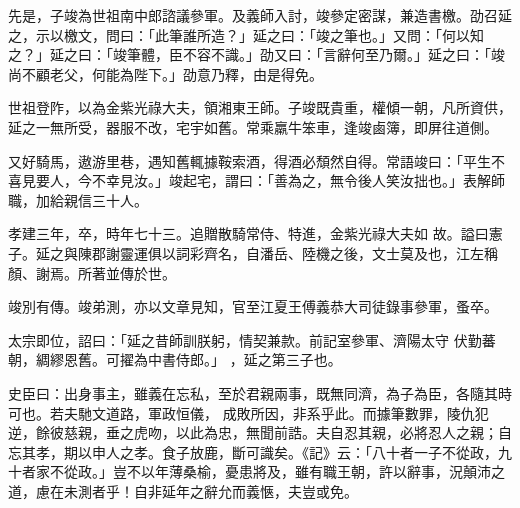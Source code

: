 \begin{pinyinscope}
 先是，子竣為世祖南中郎諮議參軍。及義師入討，竣參定密謀，兼造書檄。劭召延之，示以檄文，問曰：「此筆誰所造？」延之曰：「竣之筆也。」又問：「何以知之？」延之曰：「竣筆體，臣不容不識。」劭又曰：「言辭何至乃爾。」延之曰：「竣
 尚不顧老父，何能為陛下。」劭意乃釋，由是得免。



 世祖登阼，以為金紫光祿大夫，領湘東王師。子竣既貴重，權傾一朝，凡所資供，延之一無所受，器服不改，宅宇如舊。常乘羸牛笨車，逢竣鹵簿，即屏往道側。



 又好騎馬，遨游里巷，遇知舊輒據鞍索酒，得酒必頹然自得。常語竣曰：「平生不喜見要人，今不幸見汝。」竣起宅，謂曰：「善為之，無令後人笑汝拙也。」表解師職，加給親信三十人。



 孝建三年，卒，時年七十三。追贈散騎常侍、特進，金紫光祿大夫如
 故。謚曰憲子。延之與陳郡謝靈運俱以詞彩齊名，自潘岳、陸機之後，文士莫及也，江左稱顏、謝焉。所著並傳於世。



 竣別有傳。竣弟測，亦以文章見知，官至江夏王傅義恭大司徒錄事參軍，蚤卒。


太宗即位，詔曰：「延之昔師訓朕躬，情契兼款。前記室參軍、濟陽太守
 伏勤蕃朝，綢繆恩舊。可擢為中書侍郎。」
 ，延之第三子也。



 史臣曰：出身事主，雖義在忘私，至於君親兩事，既無同濟，為子為臣，各隨其時可也。若夫馳文道路，軍政恒儀，
 成敗所因，非系乎此。而據筆數罪，陵仇犯逆，餘彼慈親，垂之虎吻，以此為忠，無聞前誥。夫自忍其親，必將忍人之親；自忘其孝，期以申人之孝。食子放鹿，斷可識矣。《記》云：「八十者一子不從政，九十者家不從政。」豈不以年薄桑榆，憂患將及，雖有職王朝，許以辭事，況顛沛之道，慮在未測者乎！自非延年之辭允而義愜，夫豈或免。



\end{pinyinscope}